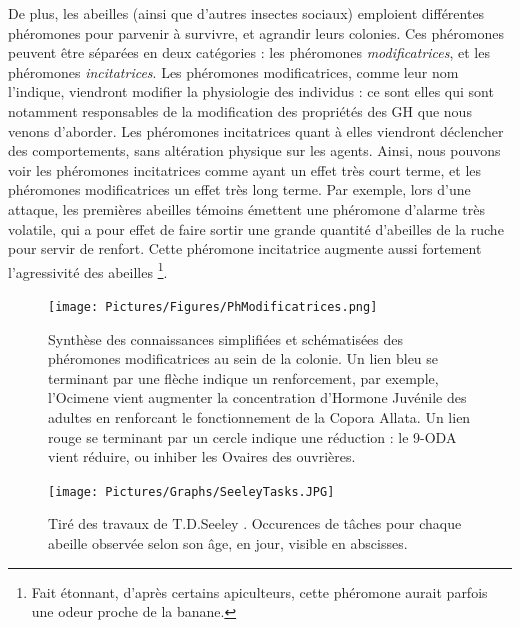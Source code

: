 			De plus, les abeilles (ainsi que d'autres insectes sociaux) emploient différentes phéromones pour parvenir à survivre, et agrandir leurs colonies. Ces phéromones peuvent être séparées en deux catégories : les phéromones \textit{modificatrices}, et les phéromones \textit{incitatrices}. Les phéromones modificatrices, comme leur nom l'indique, viendront modifier la physiologie des individus : ce sont elles qui sont notamment responsables de la modification des propriétés des GH que nous venons d'aborder. Les phéromones incitatrices quant à elles viendront déclencher des comportements, sans altération physique sur les agents. Ainsi, nous pouvons voir les phéromones incitatrices comme ayant un effet très court terme, et les phéromones modificatrices un effet très long terme. Par exemple, lors d'une attaque, les premières abeilles témoins émettent une phéromone d'alarme très volatile, qui a pour effet de faire sortir une grande quantité d'abeilles de la ruche pour servir de renfort. Cette phéromone incitatrice augmente aussi fortement l'agressivité des abeilles \footnote{Fait étonnant, d'après certains apiculteurs, cette phéromone aurait parfois une odeur proche de la banane.}.
			
			
			
			
			\begin{figure}
			\centering
				\texttt{[image: Pictures/Figures/PhModificatrices.png]}
				\caption[Synthèse des connaissances simplifiées et schématisées des phéromones modificatrices au sein de la colonie.]{Synthèse des connaissances simplifiées et schématisées des phéromones modificatrices au sein de la colonie. Un lien bleu se terminant par une flèche indique un renforcement, par exemple, l'Ocimene vient augmenter la concentration d'Hormone Juvénile des adultes en renforcant le fonctionnement de la Copora Allata. Un lien rouge se terminant par un cercle indique une réduction : le 9-ODA vient réduire, ou inhiber les Ovaires des ouvrières.}
				\label{phMod}
			\end{figure}	
			
			\begin{figure}
			\centering
				\texttt{[image: Pictures/Graphs/SeeleyTasks.JPG]}
				\caption{Tiré des travaux de T.D.Seeley \cite{seeley_wisdom_1995}. Occurences de tâches pour chaque abeille observée selon son âge, en jour, visible en abscisses.}
				\label{SeeleyTasks}
			\end{figure}	
			
